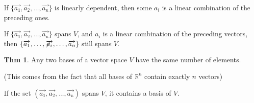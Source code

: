 \documentclass{article}
\theoremstyle{definition}
\newtheorem{theorem}[definition]{Thm}
\newcommand{\crossover}{\hspace{-0pt}\not\hspace{-2pt}}
\begin{document}
If $\{ \overrightarrow{a_1}, \overrightarrow{a_2}, \ldots, \overrightarrow{a_n} \}$ is linearly dependent, then some $a_i$ is a linear combination of the preceding ones.

If $\{ \overrightarrow{a_1}, \overrightarrow{a_2}, \ldots, \overrightarrow{a_n} \}$ spans $V$, and $a_i$ is a linear combination of the preceding vectors, then $\{ \overrightarrow{a_1}, \ldots, \crossover{\overrightarrow{a_i}}, \ldots, \overrightarrow{a_n} \}$ still spans $V$.


\begin{theorem}
    Any two bases of a vector space $V$ have the same number of elements.

    (This comes from the fact that all bases of $\mathbb{R}^n$ contain exactly $n$ vectors)
\end{theorem}

If the  set $(\overrightarrow{a_1}, \overrightarrow{a_2}, \ldots, \overrightarrow{a_n})$ spans $V$, it contains a basis of $V$.

\end{document}
